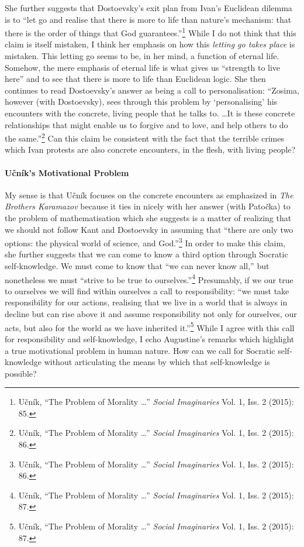 \documentclass[12pt]{article}
\begin{document}
	She further suggests that Dostoevsky's exit plan from Ivan's Euclidean dilemma is to ``let go and realise that there is more to life than nature's mechanism: that there is the order of things that God guarantees.''\footnote{U\v{c}n\'{i}k, ``The Problem of Morality \ldots'' \emph{Social Imaginaries} Vol. 1, Iss. 2 (2015): 85.} While I do not think that this claim is itself mistaken, I think her emphasis on how this \emph{letting go takes place} is mistaken. This letting go seems to be, in her mind, a function of eternal life. Somehow, the mere emphasis of eternal life is what gives us ``strength to live here'' and to see that there is more to life than Euclidean logic. She then continues to read Dostoevsky's answer as being a call to personalisation: ``Zosima, however (with Dostoevsky), sees through this problem by `personalising' his encounters with the concrete, living people that he talks to. \ldots It is these concrete relationships that might enable us to forgive and to love, and help others to do the same.''\footnote{U\v{c}n\'{i}k, ``The Problem of Morality \ldots'' \emph{Social Imaginaries} Vol. 1, Iss. 2 (2015): 86.} Can this claim be consistent with the fact that the terrible crimes which Ivan protests are also concrete encounters, in the flesh, with living people?
	
	\paragraph*{U\v{c}n\'{i}k's Motivational Problem} My sense is that U\v{c}n\'{i}k focuses on the concrete encounters as emphasized in \emph{The Brothers Karamazov} because it ties in nicely with her answer (with Pato\v{c}ka) to the problem of mathematisation which she suggests is a matter of realizing that we should not follow Kant and Dostoevsky in assuming that ``there are only two options: the physical world of science, and God.''\footnote{U\v{c}n\'{i}k, ``The Problem of Morality \ldots'' \emph{Social Imaginaries} Vol. 1, Iss. 2 (2015): 86.} In order to make this claim, she further suggests that we can come to know a third option through Socratic self-knowledge. We must come to know that ``we can never know all,'' but nonetheless we must ``strive to be true to ourselves.''\footnote{U\v{c}n\'{i}k, ``The Problem of Morality \ldots'' \emph{Social Imaginaries} Vol. 1, Iss. 2 (2015): 87.} Presumably, if we our true to ourselves we will find within ourselves a call to responsibility: ``we must take responsibility for our actions, realising that we live in a world that is always in decline but can rise above it and assume responsibility not only for ourselves, our acts, but also for the world as we have inherited it.''\footnote{U\v{c}n\'{i}k, ``The Problem of Morality \ldots'' \emph{Social Imaginaries} Vol. 1, Iss. 2 (2015): 87.} While I agree with this call for responsibility and self-knowledge, I echo Augustine's remarks which highlight a true motivational problem in human nature. How can we call for Socratic self-knowledge without articulating the means by which that self-knowledge is possible?
	
\end{document}
